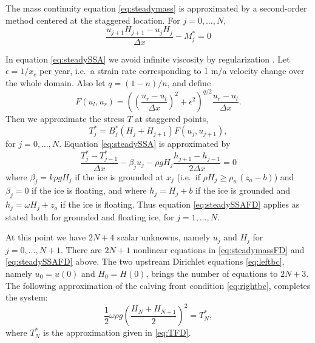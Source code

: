 \documentclass[review,letterpaper]{igs}
\newcommand{\eps}{\epsilon}
\begin{document}
The mass continuity equation \eqref{eq:steadymass} is approximated by a second-order method centered at the staggered location.  For $j=0,\dots,N$,
\begin{equation}
\frac{u_{j+1} H_{j+1} - u_j H_j}{\Delta x} - M_j^* = 0 \label{eq:steadymassFD}
\end{equation}

In equation \eqref{eq:steadySSA} we avoid infinite viscosity by regularization \citep{SchoofStream}.  Let $\eps=1/x_c$ per year, i.e.~a strain rate corresponding to 1 m$/$a velocity change over the whole domain.  Also let $q = (1-n)/n$, and define
\begin{equation}
F(u_l,u_r) = \left(\left(\frac{u_r-u_l}{\Delta x}\right)^2 + \eps^2\right)^{q/2} \frac{u_r-u_l}{\Delta x}. \label{eq:viscregFD}
\end{equation}
Then we approximate the stress $T$ at staggered points,
\begin{equation}
T_{j}^* = B_j^* \left(H_j + H_{j+1}\right) F(u_j,u_{j+1}), \label{eq:TFD}
\end{equation}
for $j=0,\dots,N$.  Equation \eqref{eq:steadySSA} is approximated by
\begin{equation}
\frac{T_{j}^* - T_{j-1}^*}{\Delta x} - \beta_j u_j - \rho g H_j \frac{h_{j+1} - h_{j-1}}{2 \Delta x} = 0 \label{eq:steadySSAFD}
\end{equation}
where $\beta_j = k \rho g H_j$ if the ice is grounded at $x_j$ (i.e.~if $\rho H_j \ge \rho_w (z_o - b)$) and $\beta_j=0$ if the ice is floating, and where $h_j = H_j + b$ if the ice is grounded and $h_j = \omega H_j + z_o$ if the ice is floating.  Thus equation \eqref{eq:steadySSAFD} applies as stated both for grounded and floating ice, for $j=1,\dots,N$.

At this point we have $2N+4$ scalar unknowns, namely $u_j$ and $H_j$ for $j=0,\dots,N+1$.  There are $2N+1$ nonlinear equations in \eqref{eq:steadymassFD} and \eqref{eq:steadySSAFD} above.  The two upstream Dirichlet equations \eqref{eq:leftbc}, namely $u_0=u(0)$ and $H_0=H(0)$, brings the number of equations to $2N+3$.  The following approximation of the calving front condition \eqref{eq:rightbc}, completes the system:
\begin{equation}
\frac{1}{2} \omega \rho g \left(\frac{H_N + H_{N+1}}{2}\right)^2 = T_N^*, \label{eq:rightbcFD}
\end{equation}
where $T_N^*$ is the approximation given in \eqref{eq:TFD}.
\end{document}
